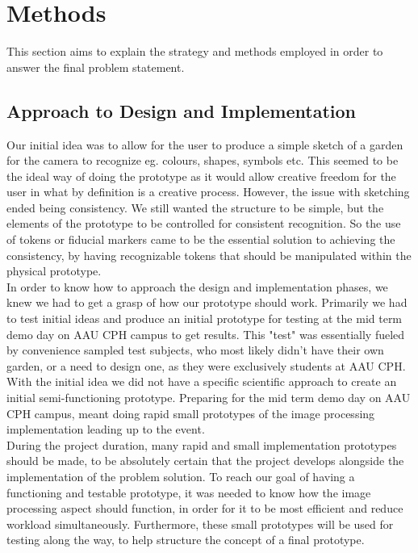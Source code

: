 \chapter{Methods}
This section aims to explain the strategy and methods employed in order to answer the final problem statement. 

\section{Approach to Design and Implementation}

Our initial idea was to allow for the user to produce a simple sketch of a garden for the camera to recognize eg. colours, shapes, symbols etc. This seemed to be the ideal way of doing the prototype as it would allow creative freedom for the user in what by definition is a creative process. However, the issue with sketching ended being consistency. We still wanted the structure to be simple, but the elements of the prototype to be controlled for consistent recognition. So the use of tokens or fiducial markers came to be the essential solution to achieving the consistency, by having recognizable tokens that should be manipulated within the physical prototype.\\


In order to know how to approach the design and implementation phases, we knew we had to get a grasp of how our prototype should work. Primarily we had to test initial ideas and produce an initial prototype for testing at the mid term demo day on AAU CPH campus to get results. This "test" was essentially fueled by convenience sampled test subjects, who most likely didn't have their own garden, or a need to design one, as they were exclusively students at AAU CPH. \\

With the initial idea we did not have a specific scientific approach to create an initial semi-functioning prototype. Preparing for the mid term demo day on AAU CPH campus, meant doing rapid small prototypes of the image processing implementation leading up to the event.\\


During the project duration, many rapid and small implementation prototypes should be made, to be absolutely certain that the project develops alongside the implementation of the problem solution.
To reach our goal of having a functioning and testable prototype, it was needed to know how the image processing aspect should function, in order for it to be most efficient and reduce workload simultaneously. Furthermore, these small prototypes will be used for testing along the way, to help structure the concept of a final prototype.\\

